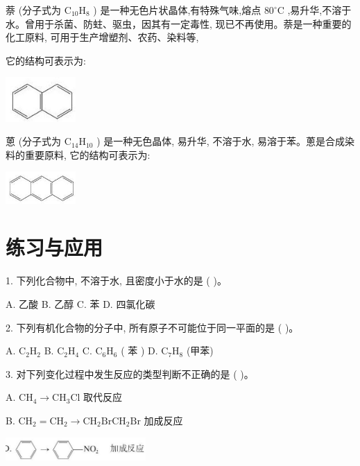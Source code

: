 \documentclass[10pt]{article}
\begin{document}
萘 (分子式为 \({\mathrm{C}}_{10}{\mathrm{H}}_{8}\) ) 是一种无色片状晶体,有特殊气味,熔点 \({80}^{ \circ }\mathrm{C}\) ,易升华,不溶于水。曾用于杀菌、防蛀、驱虫，因其有一定毒性, 现已不再使用。萘是一种重要的化工原料, 可用于生产增塑剂、农药、染料等,

它的结构可表示为:

\begin{center}
\includegraphics[max width=0.2\textwidth]{images/0190efc5-b58a-7c43-bfb0-e0a030df9cfd_53_810346.jpg}
\end{center}

蒽 (分子式为 \({\mathrm{C}}_{14}{\mathrm{H}}_{10}\) ) 是一种无色晶体, 易升华, 不溶于水, 易溶于苯。蔥是合成染料的重要原料, 它的结构可表示为:

\begin{center}
\includegraphics[max width=0.2\textwidth]{images/0190efc5-b58a-7c43-bfb0-e0a030df9cfd_53_356035.jpg}
\end{center}

\section*{练习与应用}

1. 下列化合物中, 不溶于水, 且密度小于水的是 ( )。

A. 乙酸 B. 乙醇 C. 苯 D. 四氯化碳

2. 下列有机化合物的分子中, 所有原子不可能位于同一平面的是 ( )。

A. \({\mathrm{C}}_{2}{\mathrm{H}}_{2}\) B. \({\mathrm{C}}_{2}{\mathrm{H}}_{4}\) C. \({\mathrm{C}}_{6}{\mathrm{H}}_{6}\) ( 苯 ) D. \({\mathrm{C}}_{7}{\mathrm{H}}_{8}\) (甲苯)

3. 对下列变化过程中发生反应的类型判断不正确的是 ( )。

A. \({\mathrm{{CH}}}_{4} \rightarrow {\mathrm{{CH}}}_{3}\mathrm{{Cl}}\) 取代反应

B. \({\mathrm{{CH}}}_{2} = {\mathrm{{CH}}}_{2} \rightarrow {\mathrm{{CH}}}_{2}{\mathrm{{BrCH}}}_{2}\mathrm{{Br}}\) 加成反应

\begin{center}
\includegraphics[max width=0.4\textwidth]{images/0190efc5-b58a-7c43-bfb0-e0a030df9cfd_53_119224.jpg}
\end{center}
\end{document}
